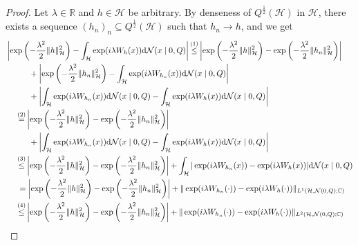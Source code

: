 \documentclass[letterpaper]{article} %
\newcommand{\R}{\mathbb{R}}
\newcommand{\hs}[1]{\mathcal{#1}} %
\newcommand{\Normal}{\mathcal{N}}
\newcommand{\C}{\mathbb{C}}
\newcommand{\stp}[2]{{\overset{(#2)}{#1}}}
\begin{document}
\begin{proof}
    Let $\lambda\in\R$ and $h\in \hs{H}$ be arbitrary.
    By denseness of $Q^\frac12(\hs{H})$ in $\hs{H}$, there exists a sequence $(h_n)_n\subseteq Q^{\frac12}(\hs{H})$ such that $h_n\rightarrow h$, and we get
    \begin{align*}
        & \left|  \exp\left(-\frac{\lambda^2}{2}\|h\|_\hs{H}^2\right) - \int_\hs{H} \exp(i\lambda W_h(x))\mathrm{d}\Normal(x\mid 0, Q)\right|
            \stp{\leq}{1}  \left|  \exp\left(-\frac{\lambda^2}{2}\|h\|_\hs{H}^2\right) -  \exp\left(-\frac{\lambda^2}{2}\|h_n\|_\hs{H}^2\right) \right| \\
            & \hspace{1cm} + \left| \exp\left(-\frac{\lambda^2}{2}\|h_n\|_\hs{H}^2\right) - \int_\hs{H} \exp(i\lambda W_{h_n}(x))\mathrm{d}\Normal(x\mid 0, Q) \right| \\
            & \hspace{1cm} + \left|\int_\hs{H} \exp(i\lambda W_{h_n}(x))\mathrm{d}\Normal(x\mid 0, Q) - \int_\hs{H} \exp(i\lambda W_h(x))\mathrm{d}\Normal(x\mid 0, Q)\right| \\
        & \hspace{0.5cm} \stp{=}{2} \left|  \exp\left(-\frac{\lambda^2}{2}\|h\|_\hs{H}^2\right) -  \exp\left(-\frac{\lambda^2}{2}\|h_n\|_\hs{H}^2\right) \right| \\
            & \hspace{1cm} + \left|\int_\hs{H} \exp(i\lambda W_{h_n}(x))\mathrm{d}\Normal(x\mid 0, Q) - \int_\hs{H} \exp(i\lambda W_h(x))\mathrm{d}\Normal(x\mid 0, Q)\right| \\
        & \hspace{0.5cm} \stp{\leq}{3}  \left|  \exp\left(-\frac{\lambda^2}{2}\|h\|_\hs{H}^2\right) - \exp\left(-\frac{\lambda^2}{2}\|h_n\|_\hs{H}^2\right) \right| 
            + \int_\hs{H} |\exp(i\lambda W_{h_n}(x)) - \exp(i\lambda W_h(x))|\mathrm{d}\Normal(x\mid 0, Q) \\
        & \hspace{0.5cm} = \left|  \exp\left(-\frac{\lambda^2}{2}\|h\|_\hs{H}^2\right) - \exp\left(-\frac{\lambda^2}{2}\|h_n\|_\hs{H}^2\right) \right| 
            + \| \exp(i\lambda W_{h_n}(\cdot)) - \exp(i\lambda W_h(\cdot))\|_{L^1(\hs{H},\Normal(0,Q);\C)} \\   
        & \hspace{0.5cm} \stp{\leq}{4} \left|  \exp\left(-\frac{\lambda^2}{2}\|h\|_\hs{H}^2\right) - \exp\left(-\frac{\lambda^2}{2}\|h_n\|_\hs{H}^2\right) \right| 
            + \| \exp(i\lambda W_{h_n}(\cdot)) - \exp(i\lambda W_h(\cdot))\|_{L^2(\hs{H},\Normal(0,Q);\C)} \\

\end{align*}
\end{proof}
\end{document}
